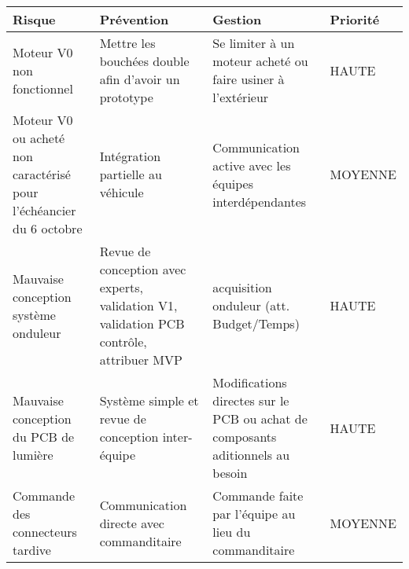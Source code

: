 \begin{tabularx}{\linewidth}{
    |>{\let\newline\\\hsize=0.40\hsize}X|%
    >{\hsize=0.25\hsize}X|%
    >{\hsize=0.25\hsize}X|%
    >{\centering\arraybackslash\hsize=0.1\hsize}X|%
  }
    \hline
    \textbf{Risque} & \textbf{Prévention} & \textbf{Gestion} & \textbf{Priorité}\\\hline
  
    Moteur V0 non fonctionnel & Mettre les bouchées double afin d'avoir un prototype & Se limiter à un moteur acheté ou faire usiner à l'extérieur & HAUTE\\\hline
    
    Moteur V0 ou acheté non caractérisé pour l'échéancier du 6 octobre & Intégration partielle au véhicule & Communication active avec les équipes interdépendantes & MOYENNE\\\hline
    
    

    Mauvaise conception système onduleur & Revue de conception avec experts, validation V1, validation PCB contrôle, attribuer MVP & acquisition onduleur (att. Budget/Temps) & HAUTE\\\hline
    
    Mauvaise conception du PCB de lumière & Système simple et revue de conception inter-équipe & Modifications directes sur le PCB ou achat de composants aditionnels au besoin & HAUTE\\\hline
    
    Commande des connecteurs tardive & Communication directe avec commanditaire & Commande faite par l'équipe au lieu du commanditaire & MOYENNE\\\hline
    

  \end{tabularx}
  
  

  
